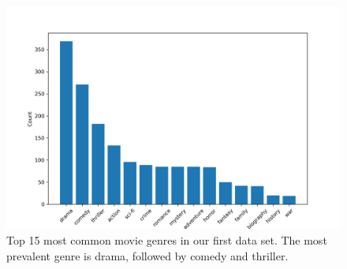 \documentclass[fleqn,moreauthors,10pt]{ds_report}
\begin{document}
\begin{figure}[h]
\begin{center}
\includegraphics[width=1.0\columnwidth]{movie_genres.png}
\end{center}
\caption{Top 15 most common movie genres in our first data set. The most prevalent genre is drama, followed by comedy and thriller.}
\label{fig1}
\end{figure}










\end{document}
